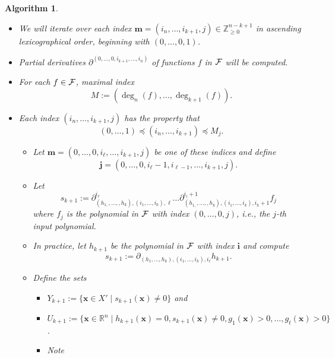 \documentclass[
]{book}
\providecommand{\tightlist}{%
  \setlength{\itemsep}{0pt}\setlength{\parskip}{0pt}}
\newtheorem{algorithm}{Algorithm}
\theoremstyle{definition}
\theoremstyle{definition}
\theoremstyle{definition}
\theoremstyle{definition}
\theoremstyle{remark}
\begin{document}
\begin{algorithm}
\begin{itemize}
\begin{itemize}
    \begin{itemize}
    \tightlist
    \item
      let \(\mathbf{i} \prec \mathbf{j}\) mean that \(\mathbf{i}\) is lexicographically less than \(\mathbf{j}\)
    \item
      and \(\mathbf{i} \preceq \mathbf{j}\) denote \(\mathbf{i}\prec \mathbf{j}\) or \(\mathbf{i} = \mathbf{j}\).
    \end{itemize}
  \item
    We will iterate over each index \(\mathbf{m} = (i_n,\ldots,i_{k+1},j) \in \mathbb{Z}_{\ge 0}^{n-k+1}\) in ascending lexicographical order, beginning with \((0,\ldots,0,1)\).
  \item
    Partial derivatives \(\partial^{(0,\ldots,0,i_{k+1},\ldots,i_n)}\) of functions \(f\) in \({\cal F}\) will be computed.
  \item
    For each \(f\in {\cal F}\), maximal index \[M := (\deg_n(f), \ldots, \deg_{k+1}(f)).\]
  \item
    Each index \((i_n,\ldots,i_{k+1},j)\) has the property that
    \[
    (0,\ldots,1) \preceq (i_n,\ldots,i_{k+1}) \preceq M_j.
    \]

    \begin{itemize}
    \item
      Let \(\mathbf{m} = (0,\ldots,0,i_\ell,\ldots,i_{k+1},j)\) be one of these indices and define
      \[
      \mathbf{j} = (0, \ldots, 0, i_{\ell} - 1, i_{\ell - 1}, \ldots, i_{k+1},j).
      \]
    \item
      Let
      \[
      s_{k+1} := \partial_{(h_{1,},\ldots,,h_{k}),(i_{1},\ldots,i_{k}),\ell}^{i_{\ell}}\ldots\partial_{(h_{1,},\ldots,,h_{k}),(i_{1},\ldots,i_{k}),i_{k}+1}^{i_{i}+1}f_{j}
      \]
      where \(f_j\) is the polynomial in \(\cal F\) with index \((0,\ldots,0,j)\), i.e., the \(j\)-th input polynomial.
    \item
      In practice, let \(h_{k+1}\) be the polynomial in \(\cal F\) with index \(\mathbf{i}\) and compute
      \[
      s_{k+1} := \partial_{(h_1,\ldots,h_k), (i_1,\ldots,i_k), i_\ell} h_{k+1}.
      \]
    \item
      Define the sets

      \begin{itemize}
      \item
        \(Y_{k+1} := \{ \mathbf{x} \in X' \mid s_{k+1}(\mathbf{x}) \ne 0 \}\) and
      \item
        \(U_{k+1} := \{ \mathbf{x} \in \mathbb{R}^n \mid h_{k+1}(\mathbf{x}) = 0, s_{k+1}(\mathbf{x}) \ne 0, g_1(\mathbf{x}) > 0 , \ldots, g_t(\mathbf{x}) > 0 \}\).
      \item
        Note


\end{itemize}
\end{itemize}
\end{itemize}
\end{itemize}
\end{algorithm}
\end{document}
